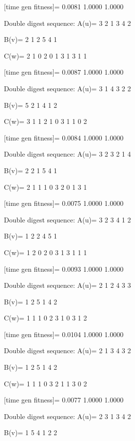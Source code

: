 [time gen fitness]=
    0.0081    1.0000    1.0000

Double digest sequence:
A(u)=
     3     2     1     3     4     2

B(v)=
     2     1     2     5     4     1

C(w)=
     2     1     0     2     0     1     3     1     3     1     1

[time gen fitness]=
    0.0087    1.0000    1.0000

Double digest sequence:
A(u)=
     3     1     4     3     2     2

B(v)=
     5     2     1     4     1     2

C(w)=
     3     1     1     2     1     0     3     1     1     0     2

[time gen fitness]=
    0.0084    1.0000    1.0000

Double digest sequence:
A(u)=
     3     2     3     2     1     4

B(v)=
     2     2     1     5     4     1

C(w)=
     2     1     1     1     0     3     2     0     1     3     1

[time gen fitness]=
    0.0075    1.0000    1.0000

Double digest sequence:
A(u)=
     3     2     3     4     1     2

B(v)=
     1     2     2     4     5     1

C(w)=
     1     2     0     2     0     3     1     3     1     1     1

[time gen fitness]=
    0.0093    1.0000    1.0000

Double digest sequence:
A(u)=
     2     1     2     4     3     3

B(v)=
     1     2     5     1     4     2

C(w)=
     1     1     1     0     2     3     1     0     3     1     2

[time gen fitness]=
    0.0104    1.0000    1.0000

Double digest sequence:
A(u)=
     2     1     3     4     3     2

B(v)=
     1     2     5     1     4     2

C(w)=
     1     1     1     0     3     2     1     1     3     0     2

[time gen fitness]=
    0.0077    1.0000    1.0000

Double digest sequence:
A(u)=
     2     3     1     3     4     2

B(v)=
     1     5     4     1     2     2

